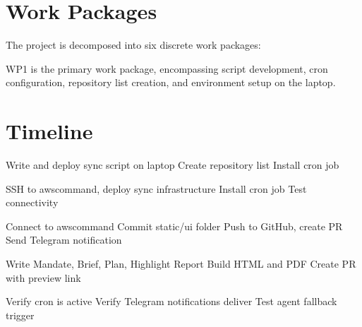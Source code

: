 \documentclass[letterpaper,10pt,openany,oneside,english]{sphinxmanual}
\begin{document}
\sphinxstepscope


\section{Work Packages}
\label{\detokenize{work_packages:work-packages}}\label{\detokenize{work_packages::doc}}
\sphinxAtStartPar
The project is decomposed into six discrete work packages:

\sphinxAtStartPar
WP1 is the primary work package, encompassing script development, cron
configuration, repository list creation, and environment setup on the laptop.

\sphinxstepscope


\section{Timeline}
\label{\detokenize{timeline:timeline}}\label{\detokenize{timeline::doc}}
\sphinxAtStartPar
{}
\sphinxhyphen{} Write and deploy sync script on laptop
\sphinxhyphen{} Create repository list
\sphinxhyphen{} Install cron job

\sphinxAtStartPar
{}
\sphinxhyphen{} SSH to aws\sphinxhyphen{}command, deploy sync infrastructure
\sphinxhyphen{} Install cron job
\sphinxhyphen{} Test connectivity

\sphinxAtStartPar
{}
\sphinxhyphen{} Connect to aws\sphinxhyphen{}command
\sphinxhyphen{} Commit static/ui folder
\sphinxhyphen{} Push to GitHub, create PR
\sphinxhyphen{} Send Telegram notification

\sphinxAtStartPar
{}
\sphinxhyphen{} Write Mandate, Brief, Plan, Highlight Report
\sphinxhyphen{} Build HTML and PDF
\sphinxhyphen{} Create PR with preview link

\sphinxAtStartPar
{}
\sphinxhyphen{} Verify cron is active
\sphinxhyphen{} Verify Telegram notifications deliver
\sphinxhyphen{} Test agent fallback trigger

\sphinxstepscope
\end{document}
